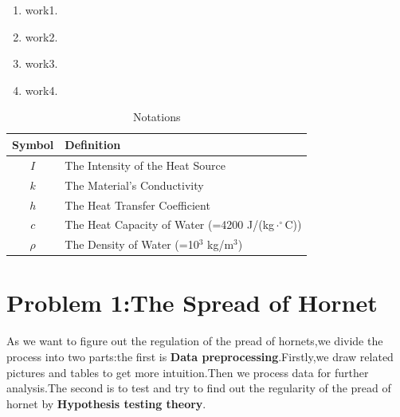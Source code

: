 \documentclass[12pt]{article}
\begin{document}
\begin{enumerate}[\bf 1.]
	\item work1.
	\item work2.
	\item work3.
	\item work4.
\end{enumerate}
\begin{table}[H]
	\begin{center}
		\caption{Notations}
		\begin{tabular}{cl}
			\toprule
			\multicolumn{1}{m{3cm}}{\centering Symbol}
			&\multicolumn{1}{m{8cm}}{\centering Definition}\\
			\midrule
			$I$&The Intensity of the Heat Source\\
			$k$&The Material's Conductivity\\
			$h$&The Heat Transfer Coefficient\\
			$c$&The Heat Capacity of Water (=4200 J/(kg$\cdot^\circ$C))\\
			$\rho$&The Density of Water (=10$^3$ kg/m$^3$)\\
			\bottomrule
		\end{tabular}\label{Ntt}
	\end{center}
\end{table}







\newpage
\section{Problem 1:The Spread of Hornet}
As we want to figure out the regulation of the pread of hornets,we divide the process into two parts:the first is \textbf{Data preprocessing}.Firstly,we draw related pictures and tables to get more intuition.Then we process data for further analysis.The second is to test and try to find out the regularity of the pread of hornet by \textbf{Hypothesis testing theory}.
\end{document}

